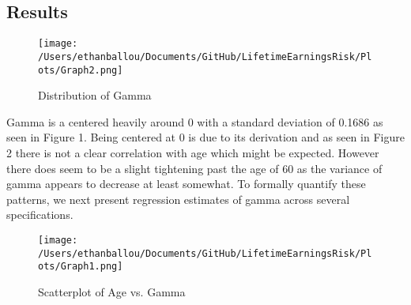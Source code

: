 \documentclass[12pt]{article}
\begin{document}
\begin{onehalfspace}
\section{Results}



\begin{figure}[H]
    \centering
    \texttt{[image: /Users/ethanballou/Documents/GitHub/LifetimeEarningsRisk/Plots/Graph2.png]}
    \caption{Distribution of Gamma}
\end{figure}






Gamma is a centered heavily around 0 with a standard deviation of 0.1686 as seen in Figure 1. Being centered at 0 is due to its derivation and as seen in Figure 2 there is not a clear correlation with age which might be expected. However there does seem to be a slight tightening past the age of 60 as the variance of gamma appears to decrease at least somewhat. To formally quantify these patterns, we next present regression estimates of gamma across several specifications.



\begin{figure}[H]
    \centering
    \texttt{[image: /Users/ethanballou/Documents/GitHub/LifetimeEarningsRisk/Plots/Graph1.png]}
    \caption{Scatterplot of Age vs. Gamma}
\end{figure}






\end{onehalfspace}
\end{document}
